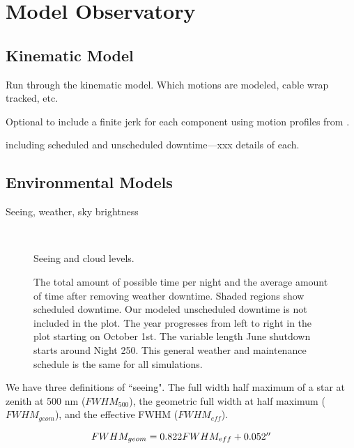 \documentclass[]{aastex631}
\begin{document}
\section{Model Observatory}\label{sec:model_obs}

\subsection{Kinematic Model}

Run through the kinematic model. Which motions are modeled, cable wrap tracked, etc.

Optional to include a finite jerk for each component using motion profiles from \citet{Mu2009}.

including scheduled and unscheduled downtime---xxx details of each.


\subsection{Environmental Models}
Seeing, weather, sky brightness

\begin{figure}
    \centering
     \\
    \caption{Seeing and cloud levels.}
    \label{fig:seeing_clouds}
\end{figure}


\begin{figure}
    \centering
    \caption{The total amount of possible time per night and the average amount of time
after removing weather downtime. Shaded regions show scheduled downtime. Our modeled
unscheduled downtime is not included in the plot. The year progresses from left to right in
the plot starting on October 1st. The variable length June shutdown starts around Night
250. This general weather and maintenance schedule is the same for all simulations.}
    \label{fig:downtime}
\end{figure}

We have three definitions of ``seeing". The full width half maximum of a star at zenith at 500 nm ($FWHM_{500}$), the geometric full width at half maximum ($FWHM_{geom}$), and the effective FWHM ($FWHM_{eff}$).

\begin{equation}
    FWHM_{geom} = 0.822 FWHM_{eff} + 0.052\arcsec
\end{equation}
\end{document}
